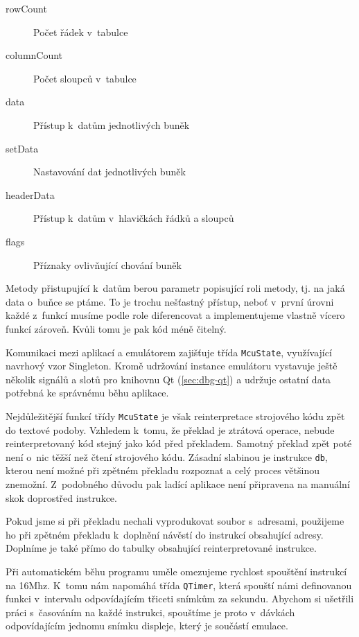 \begin{description}
	\item[rowCount] Počet řádek v~tabulce
	\item[columnCount] Počet sloupců v~tabulce
	\item[data] Přístup k~datům jednotlivých buněk
	\item[setData] Nastavování dat jednotlivých buněk
	\item[headerData] Přístup k~datům v~hlavičkách řádků a sloupců
	\item[flags] Příznaky ovlivňující chování buněk
\end{description}

Metody přistupující k~datům berou parametr popisující roli metody, tj. na jaká data o~buňce se ptáme. To je trochu nešťastný přístup, neboť v~první úrovni každé z~funkcí musíme podle role diferencovat a implementujeme vlastně vícero funkcí zároveň. Kvůli tomu je pak kód méně čitelný.


Komunikaci mezi aplikací a emulátorem zajišťuje třída \texttt{McuState}, vy\-u\-ží\-va\-jí\-cí navrhový vzor Singleton\cite{gof}. Kromě udržování instance emulátoru vystavuje ještě několik signálů a slotů pro knihovnu Qt (\ref{sec:dbg-qt}) a udržuje ostatní data potřebná ke správnému běhu aplikace.

Nejdůležitější funkcí třídy \texttt{McuState} je však reinterpretace strojového kódu zpět do textové podoby. Vzhledem k~tomu, že překlad je ztrátová operace, nebude reinterpretovaný kód stejný jako kód před překladem. Samotný překlad zpět poté není o~nic těžší než čtení strojového kódu. Zásadní slabinou je instrukce \texttt{db}, kterou není možné při zpětném překladu rozpoznat a celý proces většinou znemožní. Z~podobného důvodu pak ladící aplikace není připravena na manuální skok doprostřed instrukce.

Pokud jsme si při překladu nechali vyprodukovat soubor s~adresami, po\-u\-ži\-je\-me ho při zpětném překladu k~doplnění návěstí do instrukcí obsahující adresy. Doplníme je také přímo do tabulky obsahující reinterpretované instrukce.

Při automatickém běhu programu uměle omezujeme rychlost spouštění instrukcí na 16Mhz. K~tomu nám napomáhá třída \texttt{QTimer}, která spouští námi definovanou funkci v~intervalu odpovídajícím třiceti snímkům za sekundu. Abychom si ušetřili práci s~časováním na každé instrukci, spouštíme je proto v~dávkách odpovídajícím jednomu snímku displeje, který je součástí emulace.

